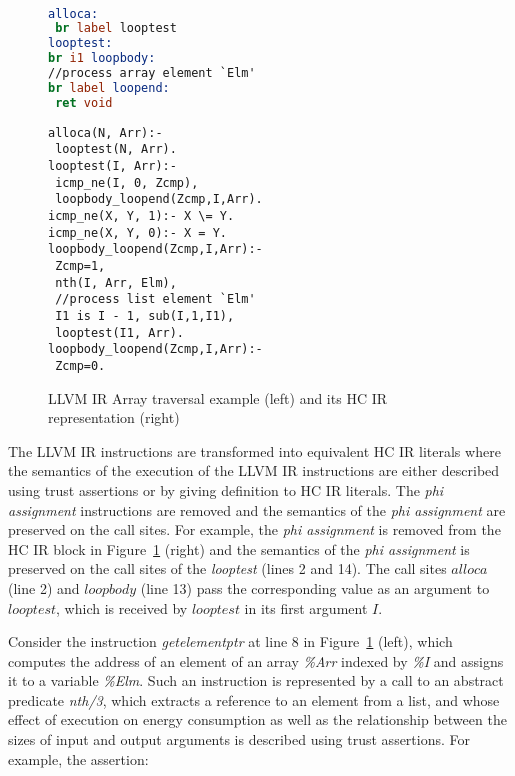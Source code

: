 \documentclass{llncs}
\newcommand{\hcir}{HC IR\xspace}
\newcommand{\llvmir}{LLVM IR\xspace}
\newcommand{\figend}{\vspace*{-5mm}}
\begin{document}
\begin{figure}[ht]
\begin{minipage}[t]{0.04\textwidth}
\ 
\end{minipage}
\begin{minipage}[t]{0.51\textwidth}
\begin{lstlisting}[language=llvm]
alloca:
 br label looptest
looptest:
br i1 loopbody:
//process array element `Elm'
br label loopend:
 ret void
\end{lstlisting}
\end{minipage}
\begin{minipage}[t]{0.45\textwidth}
\begin{lstlisting}[language=hcir]
alloca(N, Arr):-
 looptest(N, Arr).
looptest(I, Arr):-
 icmp_ne(I, 0, Zcmp),
 loopbody_loopend(Zcmp,I,Arr).
icmp_ne(X, Y, 1):- X \= Y.
icmp_ne(X, Y, 0):- X = Y.
loopbody_loopend(Zcmp,I,Arr):-
 Zcmp=1,
 nth(I, Arr, Elm),
 //process list element `Elm'
 I1 is I - 1, sub(I,1,I1),
 looptest(I1, Arr).
loopbody_loopend(Zcmp,I,Arr):-
 Zcmp=0. 
\end{lstlisting}
\end{minipage}
\caption{\llvmir Array traversal example (left) and its \hcir representation (right)}
\label{llvm2hcirblock}
\figend
\end{figure}
  

The \llvmir{} instructions are transformed into equivalent \hcir{} literals where the 
semantics of the execution of the \llvmir{} instructions are either described using trust assertions or by giving definition to \hcir{} literals. The \textit{phi assignment} instructions are removed and the semantics of the \textit{phi assignment} are preserved on the call sites. For example, the \emph{phi assignment}
is removed from the \hcir block in Figure~\ref{llvm2hcirblock} (right) and the semantics of the \emph{phi assignment}
is preserved on the call sites of the \textit{looptest}
(lines 2 and 14).  The call sites $alloca$ (line 2) and $loopbody$ (line 13) pass the
corresponding value as an argument to $looptest$, which is received by $looptest$ in
its first argument $I$.  

Consider the instruction \textit{getelementptr} at line 8
in Figure~\ref{llvm2hcirblock} (left), which computes 
the address of an element of an array
\textit{\%Arr} indexed by \textit{\%I} and assigns it to a variable
\textit{\%Elm}. 
Such an instruction is represented by a call to an
abstract predicate \textit{nth/3}, which extracts a reference to an
element from a list, and whose effect of execution on energy 
consumption as well as the relationship between the sizes of input and output arguments is described using trust assertions. For example, the assertion:
\end{document}
